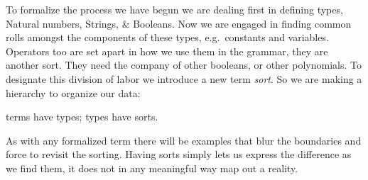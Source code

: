 To formalize the process we have begun we are dealing first in defining types, 
Natural numbers, Strings, \& Booleans.  Now we are engaged in finding common rolls 
amongst the components of these types, e.g.\ constants and variables.
Operators too are set apart in how we use them in the grammar, they are another sort.  They 
need the company of other booleans, or other polynomials.
To designate this division of labor we introduce a new term \emph{sort}.
So we are making a hierarchy to organize our data:
\begin{center}
    terms have types;
    types have sorts.
\end{center}
As with any formalized term there will be examples that blur the boundaries and force 
to revisit the sorting.  Having sorts simply lets us express the difference as we 
find them, it does not in any meaningful way map out a reality.



